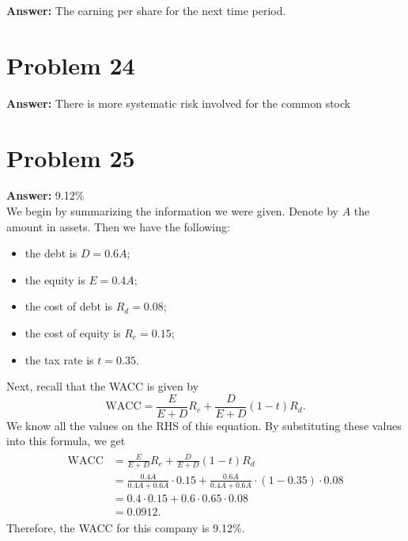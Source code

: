 \documentclass[11pt]{article}
\begin{document}
\textbf{Answer:} The earning per share for the next time period.
\section*{Problem 24}
\label{sec:org92638c6}

\textbf{Answer:} There is more systematic risk involved for the common stock
\section*{Problem 25}
\label{sec:orga871ea1}

\textbf{Answer:} 9.12\%\\

We begin by summarizing the information we were given. Denote by \(A\) the
amount in assets. Then we have the following:
\begin{itemize}
\item the debt is \(D=0.6 A\);
\item the equity is \(E=0.4 A\);
\item the cost of debt is \(R_d=0.08\);
\item the cost of equity is \(R_e=0.15\);
\item the tax rate is \(t=0.35\).
\end{itemize}
Next, recall that the WACC is given by
\begin{equation}
\mathrm{WACC}=\frac{E}{E+D}R_e+\frac{D}{E+D}(1-t)R_d.
\end{equation}
We know all the values on the RHS of this equation. By substituting these values
into this formula, we get
\begin{align}
  \begin{split}
    \mathrm{WACC}&=\frac{E}{E+D}R_e+\frac{D}{E+D}(1-t)R_d\\
    &=\frac{0.4 A}{0.4 A+0.6 A}\cdot 0.15+\frac{0.6 A}{0.4 A+0.6 A}\cdot(1-0.35)\cdot 0.08\\
    &=0.4\cdot 0.15+0.6\cdot 0.65\cdot 0.08\\
    &=0.0912.
  \end{split}
\end{align}
Therefore, the WACC for this company is 9.12\%.
\end{document}
